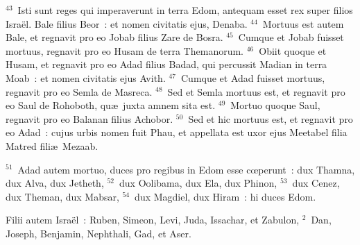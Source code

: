 ${}^{43}$~Isti sunt reges qui imperaverunt in terra Edom, antequam esset rex super filios Isra\"el. Bale filius Beor~: et nomen civitatis ejus, Denaba.
${}^{44}$~Mortuus est autem Bale, et regnavit pro eo Jobab filius Zare de Bosra.
${}^{45}$~Cumque et Jobab fuisset mortuus, regnavit pro eo Husam de terra Themanorum.
${}^{46}$~Obiit quoque et Husam, et regnavit pro eo Adad filius Badad, qui percussit Madian in terra Moab~: et nomen civitatis ejus Avith.
${}^{47}$~Cumque et Adad fuisset mortuus, regnavit pro eo Semla de Masreca.
${}^{48}$~Sed et Semla mortuus est, et regnavit pro eo Saul de Rohoboth, qu\ae\ juxta amnem sita est.
${}^{49}$~Mortuo quoque Saul, regnavit pro eo Balanan filius Achobor.
${}^{50}$~Sed et hic mortuus est, et regnavit pro eo Adad~: cujus urbis nomen fuit Phau, et appellata est uxor ejus Meetabel filia Matred fili\ae\ Mezaab.


${}^{51}$~Adad autem mortuo, duces pro regibus in Edom esse cœperunt~: dux Thamna, dux Alva, dux Jetheth,
${}^{52}$~dux Oolibama, dux Ela, dux Phinon,
${}^{53}$~dux Cenez, dux Theman, dux Mabsar,
${}^{54}$~dux Magdiel, dux Hiram~: hi duces Edom.

\lettrine[lines=3,image=true,loversize=0.05,lraise=-0.03]{F}{}ilii autem Isra\"el~: Ruben, Simeon, Levi, Juda, Issachar, et Zabulon,
${}^{2}$~Dan, Joseph, Benjamin, Nephthali, Gad, et Aser.


